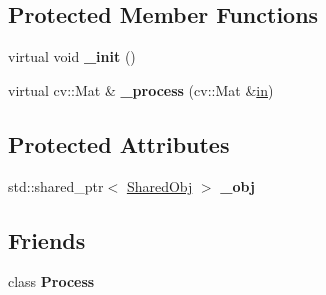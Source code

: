 \subsection*{Protected Member Functions}
\begin{DoxyCompactItemize}
\item 
\hypertarget{classs9_1_1compvis_1_1ProcessBlock_acab5d2b56bde92aa973567b3eded1a31}{virtual void {\bfseries \-\_\-init} ()}\label{classs9_1_1compvis_1_1ProcessBlock_acab5d2b56bde92aa973567b3eded1a31}

\item 
\hypertarget{classs9_1_1compvis_1_1ProcessBlock_a7765b466423cb62ad33391f96fc2490f}{virtual cv\-::\-Mat \& {\bfseries \-\_\-process} (cv\-::\-Mat \&\hyperlink{structin}{in})}\label{classs9_1_1compvis_1_1ProcessBlock_a7765b466423cb62ad33391f96fc2490f}

\end{DoxyCompactItemize}
\subsection*{Protected Attributes}
\begin{DoxyCompactItemize}
\item 
\hypertarget{classs9_1_1compvis_1_1ProcessBlock_a19eb31603bfc96501b668474d442f7e7}{std\-::shared\-\_\-ptr$<$ \hyperlink{structs9_1_1compvis_1_1ProcessBlock_1_1SharedObj}{Shared\-Obj} $>$ {\bfseries \-\_\-obj}}\label{classs9_1_1compvis_1_1ProcessBlock_a19eb31603bfc96501b668474d442f7e7}

\end{DoxyCompactItemize}
\subsection*{Friends}
\begin{DoxyCompactItemize}
\item 
\hypertarget{classs9_1_1compvis_1_1ProcessBlock_a7a4d413df5afafea63a3532759beeaa7}{class {\bfseries Process}}\label{classs9_1_1compvis_1_1ProcessBlock_a7a4d413df5afafea63a3532759beeaa7}

\end{DoxyCompactItemize}



